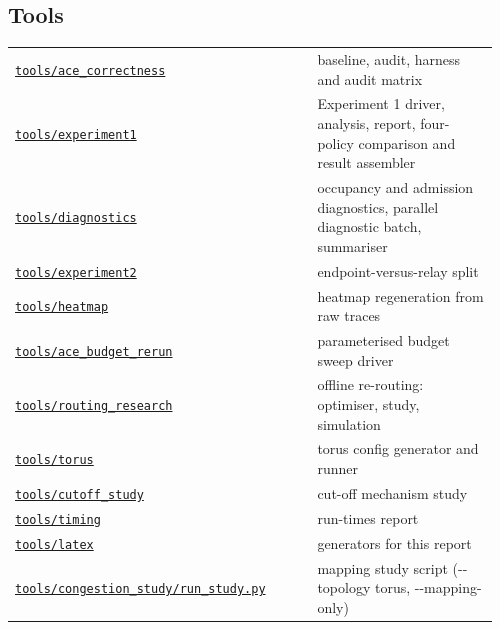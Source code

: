 {\subsection*{Tools}
\begin{longtable}{@{}p{0.60\linewidth}p{0.36\linewidth}@{}}
\href{https://github.com/sanjeevkrishnaa/Compiler-Driven-ACE/tree/codex/ace-scheduler-correctness/tools/ace_correctness}{\nolinkurl{tools/ace_correctness}} & baseline, audit, harness and audit matrix \\
\href{https://github.com/sanjeevkrishnaa/Compiler-Driven-ACE/tree/codex/ace-scheduler-correctness/tools/experiment1}{\nolinkurl{tools/experiment1}} & Experiment 1 driver, analysis, report, four-policy comparison and result assembler \\
\href{https://github.com/sanjeevkrishnaa/Compiler-Driven-ACE/tree/codex/ace-scheduler-correctness/tools/diagnostics}{\nolinkurl{tools/diagnostics}} & occupancy and admission diagnostics, parallel diagnostic batch, summariser \\
\href{https://github.com/sanjeevkrishnaa/Compiler-Driven-ACE/tree/codex/ace-scheduler-correctness/tools/experiment2}{\nolinkurl{tools/experiment2}} & endpoint-versus-relay split \\
\href{https://github.com/sanjeevkrishnaa/Compiler-Driven-ACE/tree/codex/ace-scheduler-correctness/tools/heatmap}{\nolinkurl{tools/heatmap}} & heatmap regeneration from raw traces \\
\href{https://github.com/sanjeevkrishnaa/Compiler-Driven-ACE/tree/codex/ace-scheduler-correctness/tools/ace_budget_rerun}{\nolinkurl{tools/ace_budget_rerun}} & parameterised budget sweep driver \\
\href{https://github.com/sanjeevkrishnaa/Compiler-Driven-ACE/tree/codex/ace-scheduler-correctness/tools/routing_research}{\nolinkurl{tools/routing_research}} & offline re-routing: optimiser, study, simulation \\
\href{https://github.com/sanjeevkrishnaa/Compiler-Driven-ACE/tree/codex/ace-scheduler-correctness/tools/torus}{\nolinkurl{tools/torus}} & torus config generator and runner \\
\href{https://github.com/sanjeevkrishnaa/Compiler-Driven-ACE/tree/codex/ace-scheduler-correctness/tools/cutoff_study}{\nolinkurl{tools/cutoff_study}} & cut-off mechanism study \\
\href{https://github.com/sanjeevkrishnaa/Compiler-Driven-ACE/tree/codex/ace-scheduler-correctness/tools/timing}{\nolinkurl{tools/timing}} & run-times report \\
\href{https://github.com/sanjeevkrishnaa/Compiler-Driven-ACE/tree/codex/ace-scheduler-correctness/tools/latex}{\nolinkurl{tools/latex}} & generators for this report \\
\href{https://github.com/sanjeevkrishnaa/Compiler-Driven-ACE/blob/codex/ace-scheduler-correctness/tools/congestion_study/run_study.py}{\nolinkurl{tools/congestion_study/run_study.py}} & mapping study script (-{}-topology torus, -{}-mapping-only) \\
\end{longtable}
}
